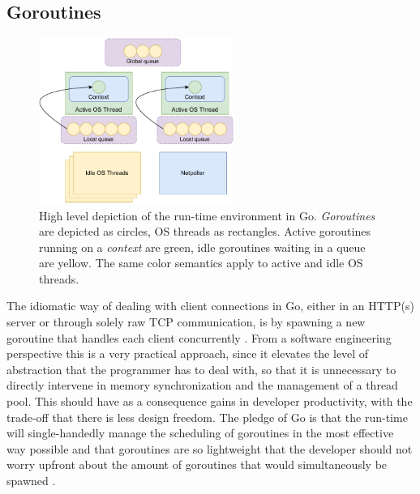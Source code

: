 \subsection{Goroutines}
\begin{figure}[!t]
	\centering
	\includegraphics[width=2.5in]{img/go_runtime.pdf}
	\caption{High level depiction of the run-time environment in Go. \textit{Goroutines} are depicted as circles, OS threads as rectangles. Active goroutines running on a \textit{context} are green, idle goroutines waiting in a queue are yellow. The same color semantics apply to active and idle OS threads.}
	\label{fig_go_runtime}
\end{figure}
The idiomatic way of dealing with client connections in Go, either in an HTTP(s) server or through solely raw TCP communication, is by spawning a new goroutine that handles each client concurrently \cite{Morsing2013_2}\cite{GoNet}\cite{GoHTTP}. From a software engineering perspective this is a very practical approach, since it elevates the level of abstraction that the programmer has to deal with, so that it is unnecessary to directly intervene in memory synchronization and the management of a thread pool. This should have as a consequence gains in developer productivity, with the trade-off that there is less design freedom. The pledge of Go is that the run-time will single-handedly manage the scheduling of goroutines in the most effective way possible and that goroutines are so lightweight that the developer should not worry upfront about the amount of goroutines that would simultaneously be spawned \cite{2013ContextSwitching}\cite{Cox-Buday2017}.

